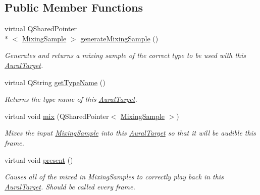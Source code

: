 \subsection*{Public Member Functions}
\begin{DoxyCompactItemize}
\item 
virtual Q\-Shared\-Pointer\\*
$<$ \hyperlink{class_picto_1_1_mixing_sample}{Mixing\-Sample} $>$ \hyperlink{class_picto_1_1_p_c_m_aural_target_a4b28bc26964cb9771e4381e47f37368f}{generate\-Mixing\-Sample} ()
\begin{DoxyCompactList}\small\item\em Generates and returns a mixing sample of the correct type to be used with this \hyperlink{class_picto_1_1_aural_target}{Aural\-Target}. \end{DoxyCompactList}\item 
\hypertarget{class_picto_1_1_p_c_m_aural_target_acf615517b41b40373755c1c77f1bb585}{virtual Q\-String \hyperlink{class_picto_1_1_p_c_m_aural_target_acf615517b41b40373755c1c77f1bb585}{get\-Type\-Name} ()}\label{class_picto_1_1_p_c_m_aural_target_acf615517b41b40373755c1c77f1bb585}

\begin{DoxyCompactList}\small\item\em Returns the type name of this \hyperlink{class_picto_1_1_aural_target}{Aural\-Target}. \end{DoxyCompactList}\item 
virtual void \hyperlink{class_picto_1_1_p_c_m_aural_target_a17bce3805e561894eacd5ac20bc8cc2a}{mix} (Q\-Shared\-Pointer$<$ \hyperlink{class_picto_1_1_mixing_sample}{Mixing\-Sample} $>$)
\begin{DoxyCompactList}\small\item\em Mixes the input \hyperlink{class_picto_1_1_mixing_sample}{Mixing\-Sample} into this \hyperlink{class_picto_1_1_aural_target}{Aural\-Target} so that it will be audible this frame. \end{DoxyCompactList}\item 
virtual void \hyperlink{class_picto_1_1_p_c_m_aural_target_a61b64002c04ef85b30be6a24c04b43f5}{present} ()
\begin{DoxyCompactList}\small\item\em Causes all of the mixed in Mixing\-Samples to correctly play back in this \hyperlink{class_picto_1_1_aural_target}{Aural\-Target}. Should be called every frame. \end{DoxyCompactList}\end{DoxyCompactItemize}


